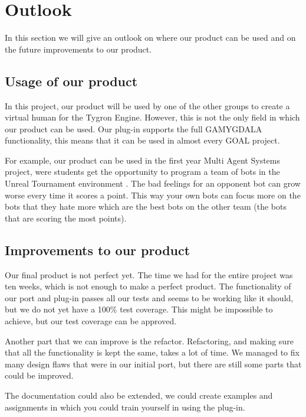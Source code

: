 \section{Outlook}
In this section we will give an outlook on where our product can be used and on the future improvements to our product.

\subsection{Usage of our product}
In this project, our product will be used by one of the other groups to create a virtual human for the Tygron Engine. However, this is not the only field in which our product can be used. Our plug-in supports the full GAMYGDALA functionality, this means that it can be used in almost every GOAL project. \par
For example, our product can be used in the first year Multi Agent Systems project, were students get the opportunity to program a team of bots in the Unreal Tournament environment \citep{UT}. The bad feelings for an opponent bot can grow worse every time it scores a point. This way your own bots can focus more on the bots that they hate more which are the best bots on the other team (the bots that are scoring the most points).

\subsection{Improvements to our product}
Our final product is not perfect yet. The time we had for the entire project was ten weeks, which is not enough to make a perfect product. The functionality of our port and plug-in passes all our tests and seems to be working like it should, but we do not yet have a 100\% test coverage. This might be impossible to achieve, but our test coverage can be approved. \par
Another part that we can improve is the refactor. Refactoring, and making sure that all the functionality is kept the same, takes a lot of time. We managed to fix many design flaws that were in our initial port, but there are still some parts that could be improved. \par
The documentation could also be extended, we could create examples and assignments in which you could train yourself in using the plug-in.